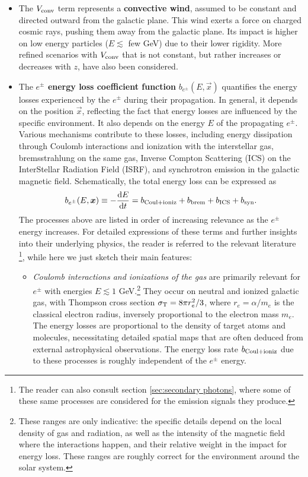\begin{itemize}
\item[$\triangleright$] The $V_{\rm conv}$ term represents a {\bf convective wind}, assumed to be constant and directed outward from the galactic plane. 
This wind exerts a force on charged cosmic rays, pushing them away from the galactic plane. Its impact is higher on low energy particles ($E \lesssim$ few GeV) due to their lower rigidity.  More refined scenarios with $V_{\rm conv}$ that is not constant, but rather increases or decreases with $z$, have also been considered.



\item[$\triangleright$] 
The {\bf $e^\pm$ energy loss coefficient function} $b_{e^\pm}(E, \vec x)$ 
quantifies the energy losses experienced by the $e^\pm$ during their propagation. 
In general, it depends on the position $\vec x$, 
reflecting the fact that energy losses are influenced by the specific environment. It also depends on the energy $E$ of the propagating $e^\pm$. 
Various mechanisms contribute to these losses, including energy dissipation through Coulomb interactions and ionization with the interstellar gas, bremsstrahlung on the same gas, Inverse Compton Scattering (ICS) on the InterStellar Radiation Field (ISRF), and synchrotron emission in the galactic magnetic field. 
Schematically, the total energy loss can be expressed as
\begin{equation}
\label{eq:btot}
b_{e^\pm}(E,\vec x) \equiv -\frac{{\rm d}E}{{\rm d}t} = b_{\rm Coul+ioniz} + b_{\rm brem} + b_{\rm ICS} + b_{\rm syn}.
\end{equation}
The processes above are listed in order of increasing relevance as the $e^\pm$ energy increases.  
For detailed expressions of these terms and further insights into their underlying physics, the reader is referred to the relevant literature \cite{CRenergylosses,PPPC4DMID}\footnote{The reader can also consult section \ref{sec:secondary photons}, where some of these same processes are considered for the emission signals they produce.}, while here we just sketch their main features:

\begin{itemize}
\item {\em Coulomb interactions and ionizations of the gas} are primarily relevant for $e^\pm$ with energies $E \lesssim 1$ GeV.\footnote{These ranges are only indicative: the specific details depend on the local density of gas and radiation, as well as the intensity of the magnetic field where the interactions happen, and their relative weight in the impact for energy loss. These ranges are roughly correct for the environment around the solar system.} They occur on neutral and ionized galactic gas, with Thompson cross section $\sigma_{\rm T} = 8\pi  r_e^2/3$, where $r_e = \alpha/m_e$ is the classical electron radius, inversely proportional to the electron mass $m_e$. 
The energy losses are proportional to the density of target atoms and molecules, necessitating detailed spatial maps that are often deduced from external astrophysical observations. The energy loss rate $b_{\rm Coul+ioniz}$ due to these processes is roughly independent of the $e^\pm$ energy.


\end{itemize}
\end{itemize}
